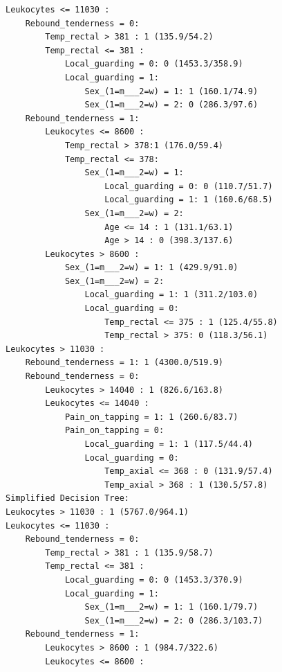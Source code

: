 \documentclass[10pt]{article}
\begin{document}
\begin{verbatim}
Leukocytes <= 11030 :
    Rebound_tenderness = 0:
        Temp_rectal > 381 : 1 (135.9/54.2)
        Temp_rectal <= 381 :
            Local_guarding = 0: 0 (1453.3/358.9)
            Local_guarding = 1:
                Sex_(1=m___2=w) = 1: 1 (160.1/74.9)
                Sex_(1=m___2=w) = 2: 0 (286.3/97.6)
    Rebound_tenderness = 1:
        Leukocytes <= 8600 :
            Temp_rectal > 378:1 (176.0/59.4)
            Temp_rectal <= 378:
                Sex_(1=m___2=w) = 1:
                    Local_guarding = 0: 0 (110.7/51.7)
                    Local_guarding = 1: 1 (160.6/68.5)
                Sex_(1=m___2=w) = 2:
                    Age <= 14 : 1 (131.1/63.1)
                    Age > 14 : 0 (398.3/137.6)
        Leukocytes > 8600 :
            Sex_(1=m___2=w) = 1: 1 (429.9/91.0)
            Sex_(1=m___2=w) = 2:
                Local_guarding = 1: 1 (311.2/103.0)
                Local_guarding = 0:
                    Temp_rectal <= 375 : 1 (125.4/55.8)
                    Temp_rectal > 375: 0 (118.3/56.1)
Leukocytes > 11030 :
    Rebound_tenderness = 1: 1 (4300.0/519.9)
    Rebound_tenderness = 0:
        Leukocytes > 14040 : 1 (826.6/163.8)
        Leukocytes <= 14040 :
            Pain_on_tapping = 1: 1 (260.6/83.7)
            Pain_on_tapping = 0:
                Local_guarding = 1: 1 (117.5/44.4)
                Local_guarding = 0:
                    Temp_axial <= 368 : 0 (131.9/57.4)
                    Temp_axial > 368 : 1 (130.5/57.8)
Simplified Decision Tree:
Leukocytes > 11030 : 1 (5767.0/964.1)
Leukocytes <= 11030 :
    Rebound_tenderness = 0:
        Temp_rectal > 381 : 1 (135.9/58.7)
        Temp_rectal <= 381 :
            Local_guarding = 0: 0 (1453.3/370.9)
            Local_guarding = 1:
                Sex_(1=m___2=w) = 1: 1 (160.1/79.7)
                Sex_(1=m___2=w) = 2: 0 (286.3/103.7)
    Rebound_tenderness = 1:
        Leukocytes > 8600 : 1 (984.7/322.6)
        Leukocytes <= 8600 :
\end{verbatim}
\end{document}
